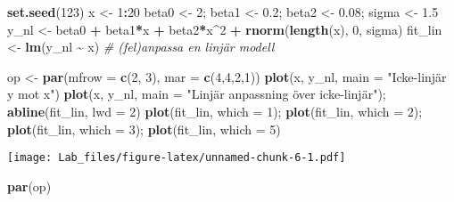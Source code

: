 \documentclass[
  11pt,
]{article}
\newenvironment{Shaded}{\begin{snugshade}}{\end{snugshade}}
\newcommand{\AttributeTok}[1]{\textcolor[rgb]{0.13,0.29,0.53}{#1}}
\newcommand{\CommentTok}[1]{\textcolor[rgb]{0.56,0.35,0.01}{\textit{#1}}}
\newcommand{\DecValTok}[1]{\textcolor[rgb]{0.00,0.00,0.81}{#1}}
\newcommand{\FloatTok}[1]{\textcolor[rgb]{0.00,0.00,0.81}{#1}}
\newcommand{\FunctionTok}[1]{\textcolor[rgb]{0.13,0.29,0.53}{\textbf{#1}}}
\newcommand{\NormalTok}[1]{#1}
\newcommand{\OtherTok}[1]{\textcolor[rgb]{0.56,0.35,0.01}{#1}}
\newcommand{\SpecialCharTok}[1]{\textcolor[rgb]{0.81,0.36,0.00}{\textbf{#1}}}
\newcommand{\StringTok}[1]{\textcolor[rgb]{0.31,0.60,0.02}{#1}}
\begin{document}
\begin{Shaded}
\begin{Highlighting}[]
\FunctionTok{set.seed}\NormalTok{(}\DecValTok{123}\NormalTok{)}
\NormalTok{x }\OtherTok{\textless{}{-}} \DecValTok{1}\SpecialCharTok{:}\DecValTok{20}
\NormalTok{beta0 }\OtherTok{\textless{}{-}} \DecValTok{2}\NormalTok{; beta1 }\OtherTok{\textless{}{-}} \FloatTok{0.2}\NormalTok{; beta2 }\OtherTok{\textless{}{-}} \FloatTok{0.08}\NormalTok{; sigma }\OtherTok{\textless{}{-}} \FloatTok{1.5}
\NormalTok{y\_nl }\OtherTok{\textless{}{-}}\NormalTok{ beta0 }\SpecialCharTok{+}\NormalTok{ beta1}\SpecialCharTok{*}\NormalTok{x }\SpecialCharTok{+}\NormalTok{ beta2}\SpecialCharTok{*}\NormalTok{x}\SpecialCharTok{\^{}}\DecValTok{2} \SpecialCharTok{+} \FunctionTok{rnorm}\NormalTok{(}\FunctionTok{length}\NormalTok{(x), }\DecValTok{0}\NormalTok{, sigma)}
\NormalTok{fit\_lin }\OtherTok{\textless{}{-}} \FunctionTok{lm}\NormalTok{(y\_nl }\SpecialCharTok{\textasciitilde{}}\NormalTok{ x)      }\CommentTok{\# (fel)anpassa en linjär modell}

\NormalTok{op }\OtherTok{\textless{}{-}} \FunctionTok{par}\NormalTok{(}\AttributeTok{mfrow =} \FunctionTok{c}\NormalTok{(}\DecValTok{2}\NormalTok{, }\DecValTok{3}\NormalTok{), }\AttributeTok{mar =} \FunctionTok{c}\NormalTok{(}\DecValTok{4}\NormalTok{,}\DecValTok{4}\NormalTok{,}\DecValTok{2}\NormalTok{,}\DecValTok{1}\NormalTok{))}
\FunctionTok{plot}\NormalTok{(x, y\_nl, }\AttributeTok{main =} \StringTok{"Icke{-}linjär y mot x"}\NormalTok{)}
\FunctionTok{plot}\NormalTok{(x, y\_nl, }\AttributeTok{main =} \StringTok{"Linjär anpassning över icke{-}linjär"}\NormalTok{); }\FunctionTok{abline}\NormalTok{(fit\_lin, }\AttributeTok{lwd =} \DecValTok{2}\NormalTok{)}
\FunctionTok{plot}\NormalTok{(fit\_lin, }\AttributeTok{which =} \DecValTok{1}\NormalTok{); }\FunctionTok{plot}\NormalTok{(fit\_lin, }\AttributeTok{which =} \DecValTok{2}\NormalTok{); }\FunctionTok{plot}\NormalTok{(fit\_lin, }\AttributeTok{which =} \DecValTok{3}\NormalTok{); }\FunctionTok{plot}\NormalTok{(fit\_lin, }\AttributeTok{which =} \DecValTok{5}\NormalTok{)}
\end{Highlighting}
\end{Shaded}

\texttt{[image: Lab\_files/figure-latex/unnamed-chunk-6-1.pdf]}

\begin{Shaded}
\begin{Highlighting}[]
\FunctionTok{par}\NormalTok{(op)}
\end{Highlighting}
\end{Shaded}
\end{document}
